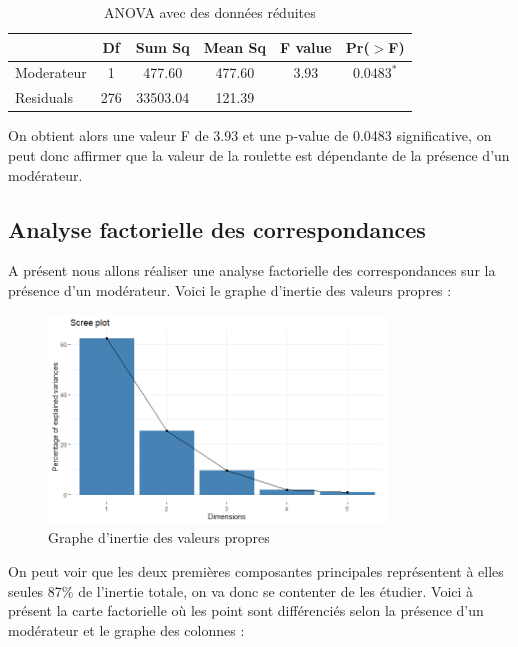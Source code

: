 \documentclass[a4paper, 12pt]{article}
\theoremstyle{exo}
\begin{document}
\begin{table}[H]
    \centering
    \begin{tabular}{lccccc}
      \hline
     & Df & Sum Sq & Mean Sq & F value & Pr($>$F) \\ 
      \hline
    Moderateur  & 1 & 477.60 & 477.60 & 3.93 & $0.0483^*$ \\ 
      Residuals   & 276 & 33503.04 & 121.39 &  &  \\ 
       \hline
    \end{tabular}
    \caption{ANOVA avec des données réduites}
\end{table}

On obtient alors une valeur F de 3.93 et une p-value de 0.0483 significative, on peut donc affirmer que la valeur de la roulette est dépendante de la présence d'un modérateur.

\subsection{Analyse factorielle des correspondances}

A présent nous allons réaliser une analyse factorielle des correspondances sur la présence d'un modérateur. Voici le graphe d'inertie des valeurs propres :

\begin{figure}[H]
\centering
\includegraphics[width=0.8\textwidth]{figures/afc_vp.png}
\caption{Graphe d'inertie des valeurs propres}
\end{figure}

\noindent On peut voir que les deux premières composantes principales représentent à elles seules 87\% de l'inertie totale, on va donc se contenter de les étudier. Voici à présent la carte factorielle où les point sont différenciés selon la présence d'un modérateur et le graphe des colonnes :
\end{document}
